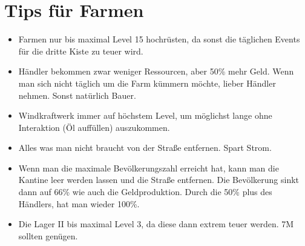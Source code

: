 \documentclass[fontsize=12pt,a4paper,draft]{scrartcl}[2003/01/01]
\begin{document}
\section{Tips für Farmen}
\begin{itemize}
  \item Farmen nur bis maximal Level 15 hochrüsten, da sonst die täglichen Events für die dritte Kiste zu teuer wird.
  \item Händler bekommen zwar weniger Ressourcen, aber 50\% mehr Geld. Wenn man sich nicht täglich um die Farm kümmern möchte, lieber Händler nehmen. Sonst natürlich Bauer.
  \item Windkraftwerk immer auf höchstem Level, um möglichst lange ohne Interaktion (Öl auffüllen) auszukommen.
  \item Alles was man nicht braucht von der Straße entfernen. Spart Strom.
  \item Wenn man die maximale Bevölkerungszahl erreicht hat, kann man die Kantine leer werden lassen und die Straße entfernen. Die Bevölkerung sinkt dann auf 66\% wie auch die Geldproduktion. Durch die 50\% plus des Händlers, hat man wieder 100\%.
  \item Die Lager II bis maximal Level 3, da diese dann extrem teuer werden. 7M sollten genügen.
\end{itemize}	
\end{document}

